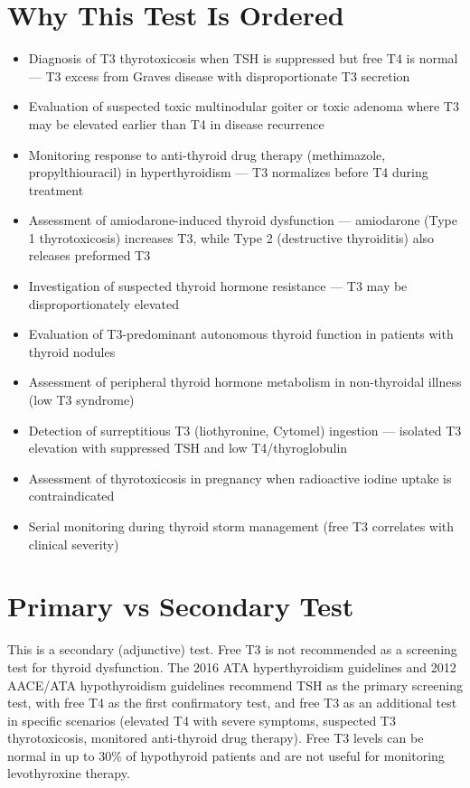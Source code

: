 \section*{Why This Test Is Ordered}
\begin{itemize}
  \item Diagnosis of T3 thyrotoxicosis when TSH is suppressed but free T4 is normal --- T3 excess from Graves disease with disproportionate T3 secretion
  \item Evaluation of suspected toxic multinodular goiter or toxic adenoma where T3 may be elevated earlier than T4 in disease recurrence
  \item Monitoring response to anti-thyroid drug therapy (methimazole, propylthiouracil) in hyperthyroidism --- T3 normalizes before T4 during treatment
  \item Assessment of amiodarone-induced thyroid dysfunction --- amiodarone (Type 1 thyrotoxicosis) increases T3, while Type 2 (destructive thyroiditis) also releases preformed T3
  \item Investigation of suspected thyroid hormone resistance --- T3 may be disproportionately elevated
  \item Evaluation of T3-predominant autonomous thyroid function in patients with thyroid nodules
  \item Assessment of peripheral thyroid hormone metabolism in non-thyroidal illness (low T3 syndrome)
  \item Detection of surreptitious T3 (liothyronine, Cytomel) ingestion --- isolated T3 elevation with suppressed TSH and low T4/thyroglobulin
  \item Assessment of thyrotoxicosis in pregnancy when radioactive iodine uptake is contraindicated
  \item Serial monitoring during thyroid storm management (free T3 correlates with clinical severity)
\end{itemize}

\section*{Primary vs Secondary Test}
This is a secondary (adjunctive) test. Free T3 is not recommended as a screening test for thyroid dysfunction. The 2016 ATA hyperthyroidism guidelines and 2012 AACE/ATA hypothyroidism guidelines recommend TSH as the primary screening test, with free T4 as the first confirmatory test, and free T3 as an additional test in specific scenarios (elevated T4 with severe symptoms, suspected T3 thyrotoxicosis, monitored anti-thyroid drug therapy). Free T3 levels can be normal in up to 30\% of hypothyroid patients and are not useful for monitoring levothyroxine therapy.

